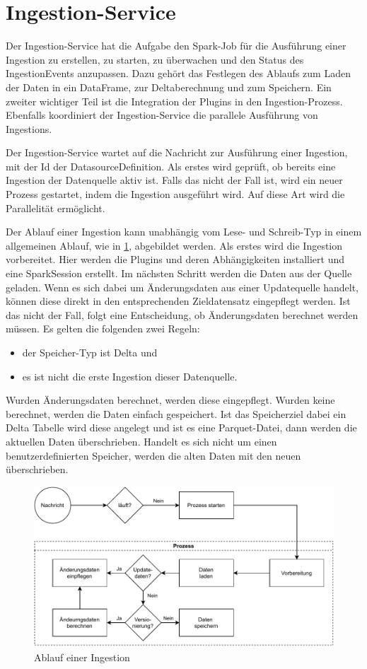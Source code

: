\section{Ingestion-Service}
\label{sec:entw-ingestion}

Der Ingestion-Service hat die Aufgabe den Spark-Job für die Ausführung einer Ingestion zu erstellen, zu starten, zu überwachen und den Status des IngestionEvents anzupassen.
Dazu gehört das Festlegen des Ablaufs zum Laden der Daten in ein DataFrame, zur Deltaberechnung und zum Speichern.
Ein zweiter wichtiger Teil ist die Integration der Plugins in den Ingestion-Prozess.
Ebenfalls koordiniert der Ingestion-Service die parallele Ausführung von Ingestions.

Der Ingestion-Service wartet auf die Nachricht zur Ausführung einer Ingestion, mit der Id der DatasourceDefinition.
Als erstes wird geprüft, ob bereits eine Ingestion der Datenquelle aktiv ist.
Falls das nicht der Fall ist, wird ein neuer Prozess gestartet, indem die Ingestion ausgeführt wird.
Auf diese Art wird die Parallelität ermöglicht.

Der Ablauf einer Ingestion kann unabhängig vom Lese- und Schreib-Typ in einem allgemeinen Ablauf, wie in \cref{fig:ingestion-ablauf}, abgebildet werden.
Als erstes wird die Ingestion vorbereitet.
Hier werden die Plugins und deren Abhängigkeiten installiert und eine SparkSession erstellt.
Im nächsten Schritt werden die Daten aus der Quelle geladen.
Wenn es sich dabei um Änderungsdaten aus einer Updatequelle handelt, können diese direkt in den entsprechenden Zieldatensatz eingepflegt werden.
Ist das nicht der Fall, folgt eine Entscheidung, ob Änderungsdaten berechnet werden müssen.
Es gelten die folgenden zwei Regeln: \begin{itemize}
    \item der Speicher-Typ ist Delta und
    \item es ist nicht die erste Ingestion dieser Datenquelle.
\end{itemize}
Wurden Änderungsdaten berechnet, werden diese eingepflegt.
Wurden keine berechnet, werden die Daten einfach gespeichert.
Ist das Speicherziel dabei ein Delta Tabelle wird diese angelegt und ist es eine Parquet-Datei, dann werden die aktuellen Daten überschrieben.
Handelt es sich nicht um einen benutzerdefinierten Speicher, werden die alten Daten mit den neuen überschrieben.

\begin{figure}
    \centering
    \includegraphics[width=\textwidth]{Grafiken/Entwicklung-Ingestion-Ablauf.pdf}
    \caption{Ablauf einer Ingestion}
    \label{fig:ingestion-ablauf}
\end{figure}